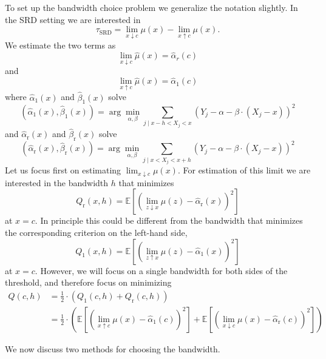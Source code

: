 \documentclass[11pt]{book}%
\begin{document}
To set up the bandwidth choice problem we generalize the notation slightly. In the SRD setting we are interested in
$$
\tau_{\mathrm{SRD}}=\lim _{x \downarrow c} \mu(x)-\lim _{x \uparrow c} \mu(x) .
$$
We estimate the two terms as
$$
\lim _{x \downarrow c} \widehat{\mu}(x)=\hat{\alpha}_{r}(c)
$$
and
$$
\lim _{x \uparrow c} \widehat{\mu}(x)=\hat{\alpha}_{1}(c)
$$
where $\hat{\alpha}_{1}(x)$ and $\hat{\beta}_{1}(x)$ solve
$$
\left(\hat{\alpha}_{1}(x), \hat{\beta}_{1}(x)\right)=\arg \min _{\alpha, \beta} \sum_{j \mid x-h<X_{j}<x}\left(Y_{j}-\alpha-\beta \cdot\left(X_{j}-x\right)\right)^{2}
$$
and $\hat{\alpha}_{\mathrm{r}}(x)$ and $\hat{\beta}_{\mathrm{r}}(x)$ solve
$$
\left(\hat{\alpha}_{\mathrm{r}}(x), \hat{\beta}_{\mathrm{r}}(x)\right)=\arg \min _{\alpha, \beta} \sum_{j \mid x<X_{j}<x+h}\left(Y_{j}-\alpha-\beta \cdot\left(X_{j}-x\right)\right)^{2}
$$
Let us focus first on estimating $\lim _{x \downarrow c} \mu(x) .$ For estimation of this limit we are interested in the bandwidth $h$ that minimizes
\begin{equation}\label{Q1}
Q_{\mathrm{r}}(x, h)=\mathbb{E}\left[\left(\lim _{z \downarrow x} \mu(z)-\hat{\alpha}_{\mathrm{r}}(x)\right)^{2}\right]
\end{equation}
at $x=c .$ In principle this could be different from the bandwidth that minimizes the corresponding criterion on the left-hand side,
\begin{equation}\label{Q2}
Q_{1}(x, h)=\mathbb{E}\left[\left(\lim _{z \uparrow x} \mu(z)-\hat{\alpha}_{1}(x)\right)^{2}\right]
\end{equation}
at $x=c .$ However, we will focus on a single bandwidth for both sides of the threshold, and therefore focus on minimizing
$$
\begin{aligned}
Q(c, h) &=\frac{1}{2} \cdot\left(Q_{1}(c, h)+Q_{\mathrm{r}}(c, h)\right) \\
&=\frac{1}{2} \cdot\left(\mathbb{E}\left[\left(\lim _{x \uparrow c} \mu(x)-\hat{\alpha}_{1}(c)\right)^{2}\right]+\mathbb{E}\left[\left(\lim _{x \downarrow c} \mu(x)-\hat{\alpha}_{\mathrm{r}}(c)\right)^{2}\right]\right)
\end{aligned}
$$

We now discuss two methods for choosing the bandwidth.
\end{document}
